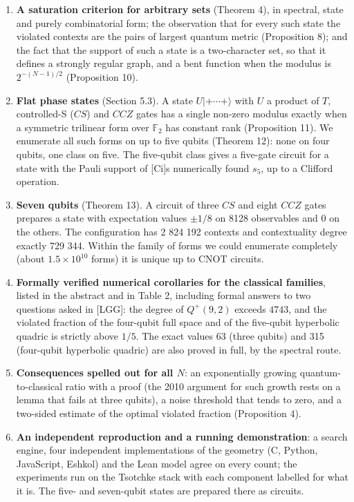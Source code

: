\documentclass[11pt,a4paper]{article}
\begin{document}
\begin{enumerate}
  imaginary amplitudes (Proposition 6).
\item
  \textbf{A saturation criterion for arbitrary sets} (Theorem 4), in spectral, state and purely combinatorial
  form; the observation that for every such state the violated contexts are the pairs of largest
  quantum metric (Proposition 8); and the fact that the support of such a state is a two-character
  set, so that it defines a strongly regular graph, and a bent function when the modulus is
  \(2^{-(N-1)/2}\) (Proposition 10).
\item
  \textbf{Flat phase states} (Section 5.3). A state \(U|{+}\cdots{+}\rangle\) with \(U\) a product of \(T\),
  controlled-S (\(CS\)) and \(CCZ\) gates has a single non-zero modulus exactly when a symmetric trilinear form
  over \(\mathbb{F}_2\) has constant rank (Proposition 11). We enumerate all such forms on up to five
  qubits (Theorem 12): none on four qubits, one class on five. The five-qubit class gives a
  five-gate circuit for a state with the Pauli support of {[}Ci{]}\textquotesingle s numerically found \(s_5\), up to a
  Clifford operation.
\item
  \textbf{Seven qubits} (Theorem 13). A circuit of three \(CS\) and eight \(CCZ\) gates prepares a state
  with expectation values \(\pm 1/8\) on 8128 observables and \(0\) on the others. The configuration has
  2 824 192 contexts and contextuality degree exactly 729 344. Within the family of forms we could
  enumerate completely (about \(1.5 \times 10^{10}\) forms) it is unique up to CNOT circuits.
\item
  \textbf{Formally verified numerical corollaries for the classical families}, listed in the abstract and in
  Table 2, including formal answers to two questions asked in {[}LGG{]}: the degree of \(Q^+(9,2)\) exceeds
  \(4743\), and the violated fraction of the four-qubit full space and of the five-qubit hyperbolic
  quadric is strictly above \(1/5\). The exact values 63 (three qubits) and 315 (four-qubit hyperbolic
  quadric) are also proved in full, by the spectral route.
\item
  \textbf{Consequences spelled out for all \(N\)}: an exponentially growing quantum-to-classical ratio with
  a proof (the 2010 argument for such growth rests on a lemma that fails at three qubits), a noise
  threshold that tends to zero, and a two-sided estimate of the optimal violated fraction (Proposition 4).
\item
  \textbf{An independent reproduction and a running demonstration}: a search engine, four independent
  implementations of the geometry (C, Python, JavaScript, Eshkol) and the Lean model agree on every
  count; the experiments run on the Tsotchke stack with each component labelled for what it is. The
  five- and seven-qubit states are prepared there as circuits.
\end{enumerate}
\end{document}
